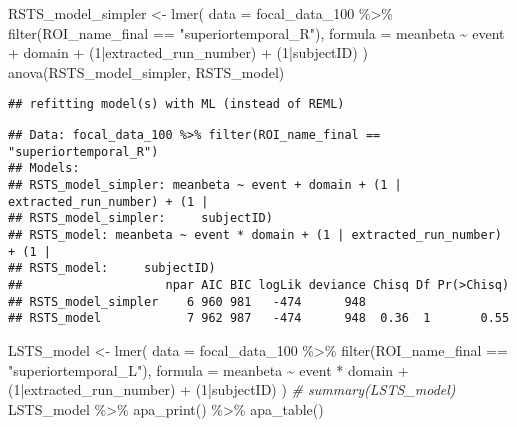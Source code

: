 \documentclass[
]{article}
\newenvironment{Shaded}{\begin{snugshade}}{\end{snugshade}}
\newcommand{\AttributeTok}[1]{\textcolor[rgb]{0.77,0.63,0.00}{#1}}
\newcommand{\CommentTok}[1]{\textcolor[rgb]{0.56,0.35,0.01}{\textit{#1}}}
\newcommand{\DecValTok}[1]{\textcolor[rgb]{0.00,0.00,0.81}{#1}}
\newcommand{\FunctionTok}[1]{\textcolor[rgb]{0.00,0.00,0.00}{#1}}
\newcommand{\NormalTok}[1]{#1}
\newcommand{\OtherTok}[1]{\textcolor[rgb]{0.56,0.35,0.01}{#1}}
\newcommand{\SpecialCharTok}[1]{\textcolor[rgb]{0.00,0.00,0.00}{#1}}
\newcommand{\StringTok}[1]{\textcolor[rgb]{0.31,0.60,0.02}{#1}}
\begin{document}
\begin{Shaded}
\begin{Highlighting}[]
\NormalTok{RSTS\_model\_simpler }\OtherTok{\textless{}{-}} \FunctionTok{lmer}\NormalTok{(}
      \AttributeTok{data =}\NormalTok{ focal\_data\_100 }\SpecialCharTok{\%\textgreater{}\%} \FunctionTok{filter}\NormalTok{(ROI\_name\_final }\SpecialCharTok{==} \StringTok{"superiortemporal\_R"}\NormalTok{),}
      \AttributeTok{formula =}\NormalTok{ meanbeta }\SpecialCharTok{\textasciitilde{}}\NormalTok{ event }\SpecialCharTok{+}\NormalTok{ domain }\SpecialCharTok{+}\NormalTok{ (}\DecValTok{1}\SpecialCharTok{|}\NormalTok{extracted\_run\_number) }\SpecialCharTok{+}\NormalTok{ (}\DecValTok{1}\SpecialCharTok{|}\NormalTok{subjectID)}
\NormalTok{    )}
\FunctionTok{anova}\NormalTok{(RSTS\_model\_simpler, RSTS\_model)}
\end{Highlighting}
\end{Shaded}

\begin{verbatim}
## refitting model(s) with ML (instead of REML)
\end{verbatim}

\begin{verbatim}
## Data: focal_data_100 %>% filter(ROI_name_final == "superiortemporal_R")
## Models:
## RSTS_model_simpler: meanbeta ~ event + domain + (1 | extracted_run_number) + (1 | 
## RSTS_model_simpler:     subjectID)
## RSTS_model: meanbeta ~ event * domain + (1 | extracted_run_number) + (1 | 
## RSTS_model:     subjectID)
##                    npar AIC BIC logLik deviance Chisq Df Pr(>Chisq)
## RSTS_model_simpler    6 960 981   -474      948                    
## RSTS_model            7 962 987   -474      948  0.36  1       0.55
\end{verbatim}

\begin{Shaded}
\begin{Highlighting}[]
\NormalTok{LSTS\_model }\OtherTok{\textless{}{-}} \FunctionTok{lmer}\NormalTok{(}
      \AttributeTok{data =}\NormalTok{ focal\_data\_100 }\SpecialCharTok{\%\textgreater{}\%} \FunctionTok{filter}\NormalTok{(ROI\_name\_final }\SpecialCharTok{==} \StringTok{"superiortemporal\_L"}\NormalTok{),}
      \AttributeTok{formula =}\NormalTok{ meanbeta }\SpecialCharTok{\textasciitilde{}}\NormalTok{ event }\SpecialCharTok{*}\NormalTok{ domain }\SpecialCharTok{+}\NormalTok{ (}\DecValTok{1}\SpecialCharTok{|}\NormalTok{extracted\_run\_number) }\SpecialCharTok{+}\NormalTok{ (}\DecValTok{1}\SpecialCharTok{|}\NormalTok{subjectID)}
\NormalTok{    )}
\CommentTok{\# summary(LSTS\_model)}
\NormalTok{LSTS\_model }\SpecialCharTok{\%\textgreater{}\%}
  \FunctionTok{apa\_print}\NormalTok{() }\SpecialCharTok{\%\textgreater{}\%}
  \FunctionTok{apa\_table}\NormalTok{()}
\end{Highlighting}
\end{Shaded}
\end{document}
